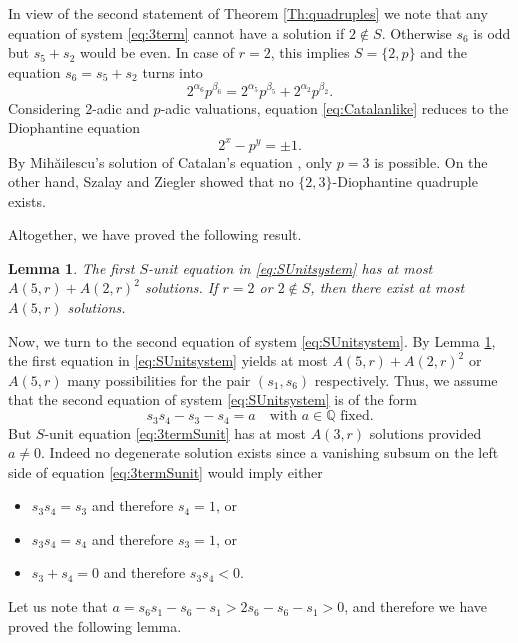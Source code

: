 \documentclass{amsart}
\newtheorem{lemma}{Lemma}
\theoremstyle{remark}
\begin{document}
In view of the second statement of Theorem \ref{Th:quadruples} we note that any equation of system \eqref{eq:3term} cannot have a solution if $2\not\in S$. 
Otherwise $s_6$ is odd but $s_5+s_2$ would be even. In case of $r=2$, this implies $S=\{2,p\}$
and the equation  $s_6=s_5+s_2$ turns into 
\begin{equation}\label{eq:Catalanlike}2^{\alpha_6}p^{\beta_6}=2^{\alpha_5}p^{\beta_5}+2^{\alpha_2}p^{\beta_2}.\end{equation}
Considering $2$-adic and $p$-adic valuations, equation \eqref{eq:Catalanlike} reduces to the Diophantine equation
$$ 2^x-p^y=\pm 1.$$
By Mih\u ailescu's solution of Catalan's equation \cite{Mihailescu:2004}, only $p=3$ is possible. On the other hand, Szalay and Ziegler 
\cite{Szalay:2013b} showed that no $\{2,3\}$-Diophantine quadruple exists.

Altogether, we have proved the following result.

\begin{lemma}\label{lem:oneEq}
The first $S$-unit equation in \eqref{eq:SUnitsystem} has at most $A(5,r)+A(2,r)^2$ solutions. If $r=2$ or $2\not \in S$, then there exist at most $A(5,r)$ 
solutions.
\end{lemma}

Now, we turn to the second equation of system \eqref{eq:SUnitsystem}. By Lemma \ref{lem:oneEq}, the first equation in \eqref{eq:SUnitsystem} yields at most 
$A(5,r)+A(2,r)^2$ or $A(5,r)$ many possibilities for the pair $(s_1,s_6)$ respectively. Thus, we assume that the second equation of system 
\eqref{eq:SUnitsystem} is 
of the form
\begin{equation}\label{eq:3termSunit} s_3s_4-s_3-s_4=a \quad \text{with $a\in {\mathbb{Q}}$ fixed}.\end{equation}
But $S$-unit equation \eqref{eq:3termSunit} has at most $A(3,r)$ solutions provided $a\neq 0$. Indeed no degenerate solution exists since a vanishing subsum 
on the left side of equation \eqref{eq:3termSunit} would imply either
\begin{itemize}
\item $s_3s_4=s_3$ and therefore $s_4=1$, or
\item $s_3s_4=s_4$ and therefore $s_3=1$, or
\item $s_3+s_4=0$ and therefore $s_3s_4<0$.
\end{itemize}

Let us note that $a=s_6s_1-s_6-s_1>2s_6-s_6-s_1>0$, and therefore we have proved the following lemma.
\end{document}

